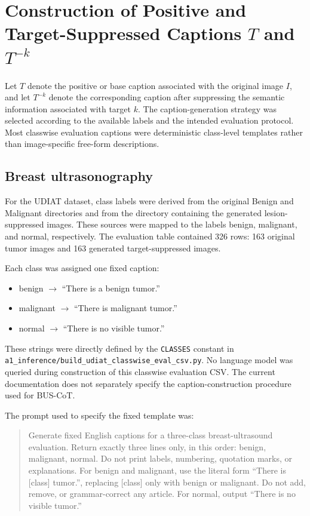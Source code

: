 \section{Construction of Positive and Target-Suppressed Captions $T$ and $T^{-k}$}

Let $T$ denote the positive or base caption associated with the original image $I$, and let $T^{-k}$ denote the corresponding caption after suppressing the semantic information associated with target $k$. The caption-generation strategy was selected according to the available labels and the intended evaluation protocol. Most classwise evaluation captions were deterministic class-level templates rather than image-specific free-form descriptions.

\subsection{Breast ultrasonography}

For the UDIAT dataset, class labels were derived from the original Benign and Malignant directories and from the directory containing the generated lesion-suppressed images. These sources were mapped to the labels benign, malignant, and normal, respectively. The evaluation table contained 326 rows: 163 original tumor images and 163 generated target-suppressed images.

Each class was assigned one fixed caption:

\begin{itemize}
  \item benign $\rightarrow$ ``There is a benign tumor.''
  \item malignant $\rightarrow$ ``There is malignant tumor.''
  \item normal $\rightarrow$ ``There is no visible tumor.''
\end{itemize}

These strings were directly defined by the \texttt{CLASSES} constant in \texttt{a1\_inference/build\_udiat\_classwise\_eval\_csv.py}. No language model was queried during construction of this classwise evaluation CSV. The current documentation does not separately specify the caption-construction procedure used for BUS-CoT.

The prompt used to specify the fixed template was:

\begin{quote}
Generate fixed English captions for a three-class breast-ultrasound evaluation. Return exactly three lines only, in this order: benign, malignant, normal. Do not print labels, numbering, quotation marks, or explanations. For benign and malignant, use the literal form ``There is [class] tumor.'', replacing [class] only with benign or malignant. Do not add, remove, or grammar-correct any article. For normal, output ``There is no visible tumor.''
\end{quote}


